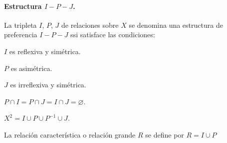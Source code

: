 \documentclass[a5paper,doc,10pt,noapacite]{apa6}
\begin{document}
{{\vspace{-2.3\baselineskip}
\begin{figure}[H]
\begin{floatrow}
	\fontsize{7}{11}\selectfont
	\captionsetup{justification=centering, labelfont=footnotesize, font=footnotesize}
\end{floatrow}
\end{figure}

\vfill
\newpage

\paragraph{Estructura \(I-P-J\).}

La tripleta \(I\), \(P\), \(J\) de relaciones sobre \(X\) se denomina una estructura de preferencia \(I-P-J\) ssi satisface las condiciones:

\vspace{1\baselineskip}
\begin{APAenumerate}
    \item \(I\) es reflexiva y simétrica.
    \item \(P\) es asimétrica.
    \item \(J\) es irreflexiva y simétrica.
    \item \(P \cap I = P \cap J = I \cap J = \varnothing\).
    \item \(X^2 = I \cup P \cup P^{-1} \cup J\). 
    \item La relación característica o relación grande \(R\) se define por \(R = I \cup P\)
\end{APAenumerate}

}}
\end{document}
